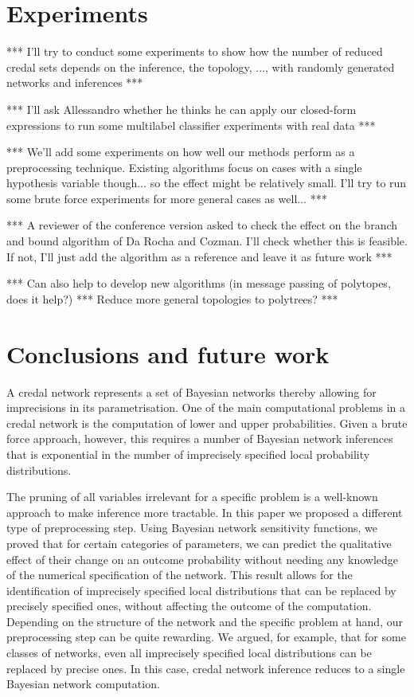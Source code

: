 \documentclass[10pt,a4paper]{paper}
\theoremstyle{definition}
\begin{document}
\section{Experiments}

{\color{red}*** I'll try to conduct some experiments to show how the number of reduced credal sets depends on the inference, the topology, ..., with randomly generated networks and inferences ***}

{\color{red}*** I'll ask Allessandro whether he thinks he can apply our closed-form expressions to run some multilabel classifier experiments with real data ***}

{\color{red}*** We'll add some experiments on how well our methods perform as a preprocessing technique. Existing algorithms focus on cases with a single hypothesis variable though... so the effect might be relatively small. I'll try to run some brute force experiments for more general cases as well... ***}

{\color{red} *** A reviewer of the conference version asked to check the effect on the branch and bound algorithm of Da Rocha and Cozman. I'll check whether this is feasible. If not, I'll just add the algorithm as a reference and leave it as future work ***}

{\color{red}*** Can also help to develop new algorithms (in message passing of polytopes, does it help?) *** Reduce more general topologies to polytrees? ***}

\section{Conclusions and future work}\label{sec:conclusion}

A credal network represents a set of Bayesian networks thereby allowing for imprecisions in its parametrisation. One of the main computational problems in a credal network is the computation of lower and upper probabilities. Given a brute force approach, however, this requires a number of Bayesian network inferences that is exponential in the number of imprecisely specified local probability distributions.

The pruning of all variables irrelevant for a specific problem is a well-known approach to make inference more tractable. In this paper we proposed a different type of preprocessing step. Using Bayesian network sensitivity functions, we proved that for certain categories of parameters, we can predict the qualitative effect of their change on an outcome probability without needing any knowledge of the numerical specification of the network. This result allows for the identification of imprecisely specified local distributions that can be replaced by precisely specified ones, without affecting the outcome of the computation.  Depending on the structure of the network and the specific problem at hand, our preprocessing step can be quite rewarding. We argued, for example, that for some classes of networks, even all imprecisely specified local distributions can be replaced by precise ones. In this case, credal network inference reduces to a single Bayesian network computation.
\end{document}
